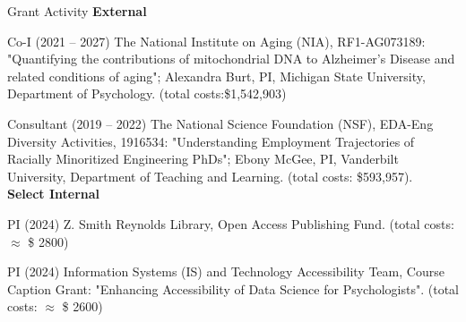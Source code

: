 \begin{rSection}{\textrm{Grant Activity}}%
{\large \textbf{External}}%
\begin{etaremune}
\item Co-I (2021 – 2027) The National Institute on Aging (NIA), RF1-AG073189: "Quantifying the contributions of mitochondrial DNA to Alzheimer's Disease and related conditions of aging"; Alexandra Burt, PI, Michigan State University, Department of Psychology. (total costs:\$1,542,903)%

\item Consultant (2019 – 2022) The National Science Foundation (NSF), EDA-Eng Diversity Activities, 1916534: "Understanding Employment Trajectories of Racially Minoritized Engineering PhDs"; Ebony McGee, PI, Vanderbilt University, Department of Teaching and Learning. (total costs: \$593,957).
\smallskip\\
\hspace*{-8mm}\large{\bf{Select Internal}}%
\item PI (2024) Z. Smith Reynolds Library, Open Access Publishing Fund. (total costs: $\approx$ \$ 2800) %
\item PI (2024) Information Systems (IS) and Technology Accessibility Team, Course Caption Grant: "Enhancing Accessibility of Data Science for Psychologists". (total costs: $\approx$ \$ 2600)%
\end{etaremune}
\end{rSection}